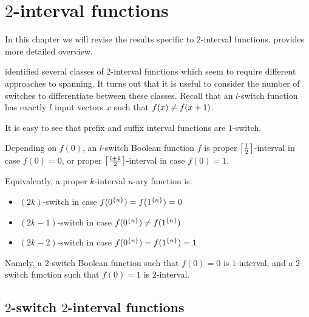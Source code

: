 \chapter{\texorpdfstring{$2$}{2}-interval functions}
\label{chap:2interval}


In this chapter we will revise the results specific to
$2$-interval functions.
\citet{Dubovsky2012}
provides more detailed overview.

\citeauthor{Dubovsky2012} identified several classes
of $2$-interval functions \citep[p.~5]{Dubovsky2012}
which seem to require different approaches to spanning.
It turns out that it is useful to consider
the number of switches
to differentiate between these classes.
Recall that an $l$-switch function has exactly $l$ input
vectors $x$ such that $\apply{f}{x} \neq \apply{f}{x+1}$.

It is easy to see that
prefix and suffix interval functions are $1$-switch.

Depending on $f(0)$,
an $l$-switch Boolean function $f$
is proper $\ceil*{\frac{l}{2}}$-interval
in case $f(0) = 0$,
or proper $\ceil*{\frac{l+1}{2}}$-interval
in case $f(0) = 1$.

Equivalently,
a proper $k$-interval $n$-ary function is:

\begin{itemize}
\item
$(2k)$-switch in case $f(\rep{0}{n}) = f(\rep{1}{n}) = 0$
\item
$(2k-1)$-switch in case $f(\rep{0}{n}) \neq f(\rep{1}{n})$
\item
$(2k-2)$-switch in case $f(\rep{0}{n}) = f(\rep{1}{n}) = 1$
\end{itemize}

Namely,
a $2$-switch Boolean function such that $f(0) = 0$
is $1$-interval,
and a $2$-switch function such that $f(0) = 1$
is $2$-interval.

\section{\texorpdfstring{$2$}{2}-switch
\texorpdfstring{$2$}{2}-interval functions}
\label{sec:2int2switch}

